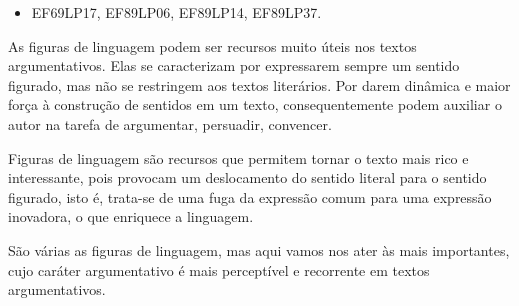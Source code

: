 \begin{itemize}
\tightlist
\item
  EF69LP17, EF89LP06, EF89LP14, EF89LP37.
\end{itemize}

As figuras de linguagem podem ser recursos muito úteis nos textos
argumentativos. Elas se caracterizam por expressarem sempre um sentido
figurado, mas não se restringem aos textos literários. Por darem
dinâmica e maior força à construção de sentidos em um texto,
consequentemente podem auxiliar o autor na tarefa de argumentar,
persuadir, convencer.

Figuras de linguagem são recursos que permitem tornar o texto mais rico
e interessante, pois provocam um deslocamento do sentido literal para o
sentido figurado, isto é, trata-se de uma fuga da expressão comum para
uma expressão inovadora, o que enriquece a linguagem.

São várias as figuras de linguagem, mas aqui vamos nos ater às mais
importantes, cujo caráter argumentativo é mais perceptível e recorrente
em textos argumentativos.

